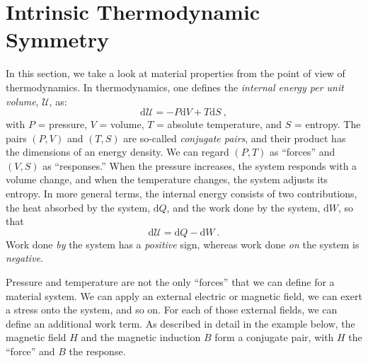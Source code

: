 \section{Intrinsic Thermodynamic Symmetry}
In this section, we take a look at material properties from the point of view of thermodynamics.  In thermodynamics, one defines the \textit{internal energy per unit volume}, $\mathcal{U}$, as:
\begin{equation}
	\mathrm{d}\mathcal{U} = -P\mathrm{d}V+T\mathrm{d}S\ ,
\end{equation}
with $P$ = pressure, $V$ = volume, $T$ = absolute temperature, and $S$ = entropy.  The pairs $(P,V)$ and  $(T,S)$ are so-called \textit{conjugate pairs}, and their product has the dimensions of an energy density. We can regard $(P,T)$ as ``forces'' and $(V,S)$ as ``responses.''  When the pressure increases, the system responds with a volume change, and when the temperature changes, the system adjusts its entropy.  In more general terms, the internal energy consists of two contributions, the heat absorbed by the system, $\mathrm{d}Q$,  and the work done by the system, $\mathrm{d}W$, so that
\begin{equation}
	\mathrm{d}\mathcal{U} = \mathrm{d}Q-\mathrm{d}W\ .
\end{equation}
Work done \textit{by} the system has a \textit{positive} sign, whereas work done \textit{on} the system is \textit{negative}.

Pressure and temperature are not the only ``forces'' that we can define for a material system.  We can apply an external electric or magnetic field, we can exert a stress onto the system, and so on.  For each of those external fields, we can define an additional work term.  As described in detail in the example below, the magnetic field $H$ and the magnetic induction $B$ form a conjugate pair, with $H$ the ``force'' and $B$ the response.

